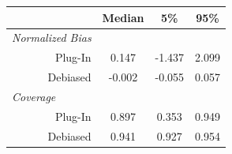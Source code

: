 \begin{tabular}[t]{r|ccc}
\toprule
 & Median & 5\% & 95\%\\
\midrule
\multicolumn{1}{l|}{\textit{Normalized Bias}}\\
Plug-In & 0.147 & -1.437 & 2.099\\
Debiased & -0.002 & -0.055 & 0.057\\
\midrule
\multicolumn{1}{l|}{\textit{Coverage}}\\
Plug-In & 0.897 & 0.353 & 0.949\\
Debiased & 0.941 & 0.927 & 0.954\\
\bottomrule
\end{tabular}